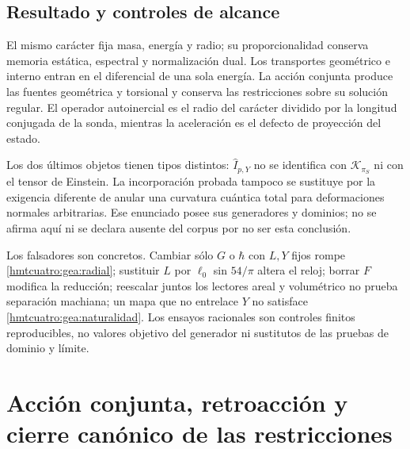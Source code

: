 \subsection{Resultado y controles de alcance}
\label{hmtcuatro:gea:conclusion}

El mismo carácter fija masa, energía y radio; su proporcionalidad
conserva memoria estática, espectral y normalización dual.
Los transportes geométrico e interno entran en el diferencial
de una sola energía. La acción conjunta produce las fuentes
geométrica y torsional y conserva las restricciones sobre su
solución regular. El operador autoinercial es el radio del
carácter dividido por la longitud conjugada de la sonda,
mientras la aceleración es el defecto de proyección del estado.

Los dos últimos objetos tienen tipos distintos:
$\widehat I_{p,Y}$ no se identifica con $\mathcal K_{\pi_S}$
ni con el tensor de Einstein. La incorporación probada tampoco
se sustituye por la exigencia diferente de anular una curvatura
cuántica total para deformaciones normales arbitrarias.
Ese enunciado posee sus generadores y dominios; no se afirma aquí
ni se declara ausente del corpus por no ser esta conclusión.

Los falsadores son concretos. Cambiar sólo $G$ o $\hbar$ con
$L,Y$ fijos rompe \eqref{hmtcuatro:gea:radial}; sustituir
$L$ por $\ell_0$ sin $54/\pi$ altera el reloj; borrar $F$
modifica la reducción; reescalar juntos los lectores areal y
volumétrico no prueba separación machiana; un mapa que no
entrelace $Y$ no satisface \eqref{hmtcuatro:gea:naturalidad}.
Los ensayos racionales son controles finitos reproducibles,
no valores objetivo del generador ni sustitutos de las pruebas
de dominio y límite.

\section{Acción conjunta, retroacción y cierre canónico de las restricciones}
\label{hmtcuatro:accion-retroaccion-restricciones}

